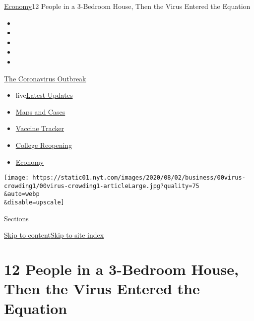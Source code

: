 \href{/section/business/economy}{Economy}\textbar{}12 People in a
3-Bedroom House, Then the Virus Entered the Equation

\begin{itemize}
\item
\item
\item
\item
\item
\end{itemize}

\href{https://www.nytimes.com/news-event/coronavirus?action=click\&pgtype=Article\&state=default\&region=TOP_BANNER\&context=storylines_menu}{The
Coronavirus Outbreak}

\begin{itemize}
\tightlist
\item
  live\href{https://www.nytimes.com/2020/08/03/world/coronavirus-covid-19.html?action=click\&pgtype=Article\&state=default\&region=TOP_BANNER\&context=storylines_menu}{Latest
  Updates}
\item
  \href{https://www.nytimes.com/interactive/2020/us/coronavirus-us-cases.html?action=click\&pgtype=Article\&state=default\&region=TOP_BANNER\&context=storylines_menu}{Maps
  and Cases}
\item
  \href{https://www.nytimes.com/interactive/2020/science/coronavirus-vaccine-tracker.html?action=click\&pgtype=Article\&state=default\&region=TOP_BANNER\&context=storylines_menu}{Vaccine
  Tracker}
\item
  \href{https://www.nytimes.com/2020/08/02/us/covid-college-reopening.html?action=click\&pgtype=Article\&state=default\&region=TOP_BANNER\&context=storylines_menu}{College
  Reopening}
\item
  \href{https://www.nytimes.com/live/2020/08/03/business/stock-market-today-coronavirus?action=click\&pgtype=Article\&state=default\&region=TOP_BANNER\&context=storylines_menu}{Economy}
\end{itemize}

\texttt{[image: https://static01.nyt.com/images/2020/08/02/business/00virus-crowding1/00virus-crowding1-articleLarge.jpg?quality=75\\\&auto=webp\\\&disable=upscale]}

Sections

\protect\hyperlink{site-content}{Skip to
content}\protect\hyperlink{site-index}{Skip to site index}

\hypertarget{12-people-in-a-3-bedroom-house-then-the-virus-entered-the-equation}{%
\section{12 People in a 3-Bedroom House, Then the Virus Entered the
Equation}\label{12-people-in-a-3-bedroom-house-then-the-virus-entered-the-equation}}

